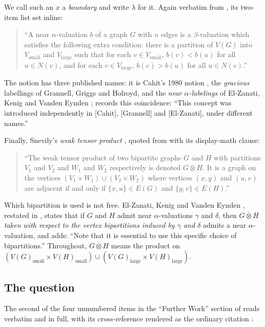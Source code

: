 \documentclass[11pt]{amsart}
\theoremstyle{definition}
\theoremstyle{remark}
\newcommand{\wtp}{\mathbin{\overline{\otimes}}}
\newcommand{\Vsm}{V_{\mathrm{small}}}
\newcommand{\Vlg}{V_{\mathrm{large}}}
\begin{document}
We call such an $x$ a \emph{boundary} and write $\lambda$ for it. Again
verbatim from \cite{AHM}, its two-item list set inline:

\begin{quote}
``A near $\alpha$-valuation $b$ of a graph $G$ with $n$ edges is a
$\beta$-valuation which satisfies the following extra condition: there is a
partition of $V(G)$ into $\Vsm$ and $\Vlg$ such that for each $v\in\Vsm$,
$b(v)<b(u)$ for all $u\in N(v)$, and for each $v\in\Vlg$, $b(v)>b(u)$ for all
$u\in N(v)$.''
\end{quote}

The notion has three published names: it is Cahit's 1980 notion
\cite{Cahit}, the \emph{gracious} labellings of Grannell, Griggs and Holroyd,
and the \emph{near $\alpha$-labelings} of El-Zanati, Kenig and Vanden Eynden
\cite{EKV}; \cite{AHM} records this coincidence: ``This concept was introduced
independently in [Cahit], [Grannell] and [El-Zanati], under different names.''

Finally, Snevily's \emph{weak tensor product} \cite{Snevily}, quoted from
\cite{AHM} with its display-math clause:

\begin{quote}
``The weak tensor product of two bipartite graphs $G$ and $H$ with partitions
$V_1$ and $V_2$ and $W_1$ and $W_2$ respectively is denoted $G\wtp H$. It is a
graph on the vertices $(V_1\times W_1)\cup(V_2\times W_2)$ where vertices
$(x,y)$ and $(u,v)$ are adjacent if and only if
$\{x,u\}\in E(G)$ and $\{y,v\}\in E(H)$.''
\end{quote}

Which bipartition is used is not free. El-Zanati, Kenig and Vanden Eynden
\cite[Thm.~7]{EKV}, restated in \cite{AHM}, states that if $G$ and $H$ admit
near $\alpha$-valuations $\gamma$ and $\delta$, then $G\wtp H$ \emph{taken with
respect to the vertex bipartitions induced by $\gamma$ and $\delta$} admits a
near $\alpha$-valuation, and \cite{AHM} adds: ``Note that it is essential to use
this specific choice of bipartitions.'' Throughout, $G\wtp H$ means the product
on
$(V(G)_{\mathrm{small}}\times V(H)_{\mathrm{small}})\cup
(V(G)_{\mathrm{large}}\times V(H)_{\mathrm{large}})$.

\subsection*{The question}
The second of the four unnumbered items in the ``Further Work'' section of
\cite{AHM} reads verbatim and in full, with its cross-reference rendered as the
ordinary citation \cite[Thm.~7]{EKV}:
\end{document}
